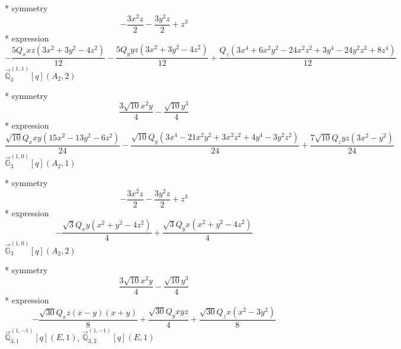 \documentclass[fleqn,8pt]{jsarticle}
\begin{document}
\noindent\quad ** symmetry
\begin{dmath*}
- \frac{3 x^{2} z}{2} - \frac{3 y^{2} z}{2} + z^{3}
\end{dmath*}
\noindent\quad ** expression
\begin{dmath*}
- \frac{5 Q_{x} x z \left(3 x^{2} + 3 y^{2} - 4 z^{2}\right)}{12} - \frac{5 Q_{y} y z \left(3 x^{2} + 3 y^{2} - 4 z^{2}\right)}{12} + \frac{Q_{z} \left(3 x^{4} + 6 x^{2} y^{2} - 24 x^{2} z^{2} + 3 y^{4} - 24 y^{2} z^{2} + 8 z^{4}\right)}{12}
\end{dmath*}
\noindent\quad $\vec{\mathbb{Q}}_{3}^{(1,1)}[q](A_{2},2)$

\noindent\quad ** symmetry
\begin{dmath*}
\frac{3 \sqrt{10} x^{2} y}{4} - \frac{\sqrt{10} y^{3}}{4}
\end{dmath*}
\noindent\quad ** expression
\begin{dmath*}
\frac{\sqrt{10} Q_{x} x y \left(15 x^{2} - 13 y^{2} - 6 z^{2}\right)}{24} - \frac{\sqrt{10} Q_{y} \left(3 x^{4} - 21 x^{2} y^{2} + 3 x^{2} z^{2} + 4 y^{4} - 3 y^{2} z^{2}\right)}{24} + \frac{7 \sqrt{10} Q_{z} y z \left(3 x^{2} - y^{2}\right)}{24}
\end{dmath*}
\noindent\quad $\vec{\mathbb{G}}_{3}^{(1,0)}[q](A_{2},1)$

\noindent\quad ** symmetry
\begin{dmath*}
- \frac{3 x^{2} z}{2} - \frac{3 y^{2} z}{2} + z^{3}
\end{dmath*}
\noindent\quad ** expression
\begin{dmath*}
- \frac{\sqrt{3} Q_{x} y \left(x^{2} + y^{2} - 4 z^{2}\right)}{4} + \frac{\sqrt{3} Q_{y} x \left(x^{2} + y^{2} - 4 z^{2}\right)}{4}
\end{dmath*}
\noindent\quad $\vec{\mathbb{G}}_{3}^{(1,0)}[q](A_{2},2)$

\noindent\quad ** symmetry
\begin{dmath*}
\frac{3 \sqrt{10} x^{2} y}{4} - \frac{\sqrt{10} y^{3}}{4}
\end{dmath*}
\noindent\quad ** expression
\begin{dmath*}
- \frac{\sqrt{30} Q_{x} z \left(x - y\right) \left(x + y\right)}{8} + \frac{\sqrt{30} Q_{y} x y z}{4} + \frac{\sqrt{30} Q_{z} x \left(x^{2} - 3 y^{2}\right)}{8}
\end{dmath*}
\noindent\quad $\vec{\mathbb{Q}}_{3,1}^{(1,-1)}[q](E,1)$, $\vec{\mathbb{Q}}_{3,2}^{(1,-1)}[q](E,1)$
\end{document}
